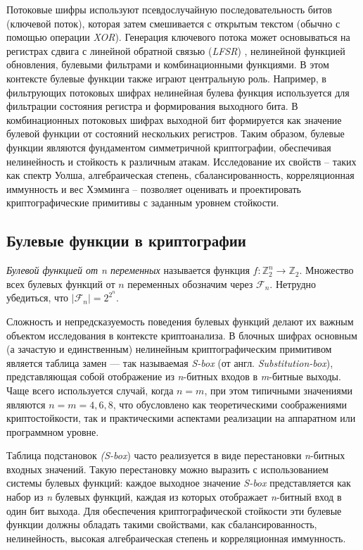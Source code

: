 Потоковые шифры используют псевдослучайную последовательность битов (ключевой поток), которая затем смешивается с открытым текстом (обычно с помощью операции \textit{XOR}). Генерация ключевого потока может основываться на регистрах сдвига с линейной обратной связью (\textit{LFSR}) \cite{babash}, нелинейной функцией обновления, булевыми фильтрами и комбинационными функциями.
В этом контексте булевые функции также играют центральную роль. Например, в фильтрующих потоковых шифрах нелинейная булева функция используется для фильтрации состояния регистра и формирования выходного бита. В комбинационных потоковых шифрах выходной бит формируется как значение булевой функции от состояний нескольких регистров. 
Таким образом, булевые функции являются фундаментом симметричной криптографии, обеспечивая нелинейность и стойкость к различным атакам. Исследование их свойств – таких как спектр Уолша, алгебраическая степень, сбалансированность, корреляционная иммунность и вес Хэмминга – позволяет оценивать и проектировать криптографические примитивы с заданным уровнем стойкости.
\subsection{Булевые функции в криптографии}
\textit{Булевой функцией от n переменных} называется функция \mbox{$f:\mathbb{Z}_2^n\rightarrow\mathbb{Z}_2$}.
Множество всех булевых функций от $n$ переменных обозначим через $\mathcal{F}_n$. Нетрудно убедиться, что $|\mathcal{F}_n| = 2^{2^n}$.

Сложность и непредсказуемость поведения булевых функций делают их важным объектом исследования в контексте криптоанализа. В блочных шифрах основным (а зачастую и единственным) нелинейным криптографическим примитивом является таблица замен — так называемая \textit{S-box} (от англ. \textit{Substitution-box}), представляющая собой отображение из \textit{n}-битных входов в \textit{m}-битные выходы. Чаще всего используется случай, когда $n=m$, при этом типичными значениями являются $n=m=4,6,8$, что обусловлено как теоретическими соображениями криптостойкости, так и практическими аспектами реализации на аппаратном или программном уровне.

Таблица подстановок \textit{(S-box}) часто реализуется в виде перестановки \textit{n}-битных входных значений. Такую перестановку можно выразить с использованием системы булевых функций: каждое выходное значение \textit{S-box} представляется как набор из \textit{n} булевых функций, каждая из которых отображает \textit{n}-битный вход в один бит выхода. Для обеспечения криптографической стойкости эти булевые функции должны обладать такими свойствами, как сбалансированность, нелинейность, высокая алгебраическая степень и корреляционная иммунность.
